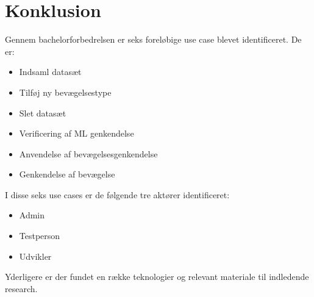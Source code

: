\thispagestyle{fancy}
\chapter{Konklusion}
\label{chp:konklusion}
Gennem bachelorforbedrelsen er seks foreløbige use case blevet identificeret. De er:
\begin{itemize}
	\item Indsaml datasæt
	\item Tilføj ny bevægelsestype
	\item Slet datasæt
	\item Verificering af ML genkendelse
	\item Anvendelse af bevægelsesgenkendelse
	\item Genkendelse af bevægelse
\end{itemize}
I disse seks use cases er de følgende tre aktører identificeret:
\begin{itemize}
	\item Admin
	\item Testperson
	\item Udvikler
\end{itemize}
Yderligere er der fundet en række teknologier og relevant materiale til indledende research.